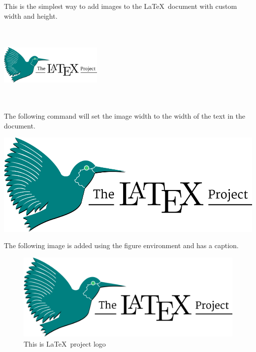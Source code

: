 \documentclass[12pt, letter]{article}
\begin{document}
\listoffigures
\newpage

This is the simplest way to add images to the \LaTeX\ document with custom width and height.

\medskip

\includegraphics[width=5cm, height=4cm]{latex-logo}

The following command will set the image width to the width of the text in the document.

\medskip

\includegraphics[width=\textwidth]{latex-logo}

\medskip


The following image is added using the figure environment and has a caption.

\begin{figure}[h]
	\centering
	\includegraphics[width=\textwidth]{latex-logo}
	\caption{This is \LaTeX\ project logo}
	\label{logo}
\end{figure}
\end{document}
